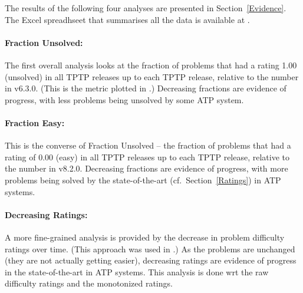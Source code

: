 \documentclass[runningheads]{llncs}
\begin{document}
\vspace*{1em}
\noindent
The results of the following four analyses are presented in Section~\ref{Evidence}.
The Excel spreadhseet that summarises all the data is available at
\href{}{}.

\paragraph{Fraction Unsolved:}
The first overall analysis looks at the fraction of problems that had a rating 1.00 
(unsolved) in all TPTP releases up to each TPTP release, relative to the number in v6.3.0.
(This is the metric plotted in \cite{SSP21}.)
Decreasing fractions are evidence of progress, with less problems being unsolved by some ATP 
system.

\paragraph{Fraction Easy:}
This is the converse of Fraction Unsolved -- the fraction of problems that had a rating of 
0.00 (easy) in all TPTP releases up to each TPTP release, relative to the number in v8.2.0.
Decreasing fractions are evidence of progress, with more problems being solved by the 
state-of-the-art (cf.~Section~\ref{Ratings}) in ATP systems.

\paragraph{Decreasing Ratings:}
A more fine-grained analysis is provided by the decrease in problem difficulty ratings over
time. 
(This approach was used in \cite{SFS01}.)
As the problems are unchanged (they are not actually getting easier), decreasing ratings are 
evidence of progress in the state-of-the-art in ATP systems.
This analysis is done wrt the raw difficulty ratings and the monotonized ratings.
\end{document}
